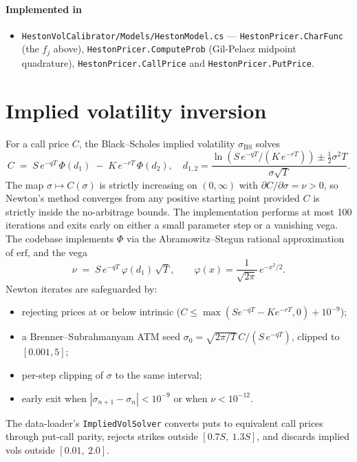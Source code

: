 \documentclass[11pt,a4paper]{article}
\begin{document}
\paragraph*{Implemented in}
\begin{itemize}
\item \texttt{HestonVolCalibrator/Models/HestonModel.cs} --- \texttt{HestonPricer.CharFunc} (the $f_j$ above), \texttt{HestonPricer.ComputeProb} (Gil-Pelaez midpoint quadrature), \texttt{HestonPricer.CallPrice} and \texttt{HestonPricer.PutPrice}.
\end{itemize}

\section{Implied volatility inversion}
\label{sec:iv}
For a call price $C$, the Black--Scholes implied volatility $\sigma_{\text{BS}}$
solves
\[
C \;=\; S\, e^{-q T}\, \Phi(d_1) \;-\; K\, e^{-r T}\, \Phi(d_2),
\quad
d_{1,2} = \frac{\ln(S\, e^{-q T} / (K\, e^{-r T})) \pm \tfrac12 \sigma^2 T}{\sigma \sqrt{T}}.
\]
The map $\sigma \mapsto C(\sigma)$ is strictly increasing on $(0,\infty)$ with
$\partial C/\partial \sigma = \nu > 0$, so Newton's method converges from any
positive starting point provided $C$ is strictly inside the no-arbitrage bounds.
The implementation performs at most 100 iterations and exits early on either
a small parameter step or a vanishing vega.
The codebase implements $\Phi$ via the Abramowitz--Stegun rational approximation of $\mathrm{erf}$,
and the vega
\[
\nu \;=\; S\, e^{-q T}\, \varphi(d_1)\, \sqrt{T},
\qquad \varphi(x) = \frac{1}{\sqrt{2\pi}}\, e^{-x^2/2}.
\]
Newton iterates are safeguarded by:
\begin{itemize}
\item rejecting prices at or below intrinsic ($C \le \max(S e^{-qT} - K e^{-rT}, 0) + 10^{-9}$);
\item a Brenner--Subrahmanyam ATM seed $\sigma_0 = \sqrt{2\pi/T}\, C/(S\, e^{-qT})$, clipped to $[0.001, 5]$;
\item per-step clipping of $\sigma$ to the same interval;
\item early exit when $|\sigma_{n+1} - \sigma_n| < 10^{-9}$ or when $\nu < 10^{-12}$.
\end{itemize}
The data-loader's \texttt{ImpliedVolSolver} converts puts to equivalent call prices
through put-call parity, rejects strikes outside $[0.7 S,\ 1.3 S]$, and discards
implied vols outside $[0.01,\ 2.0]$.
\end{document}
